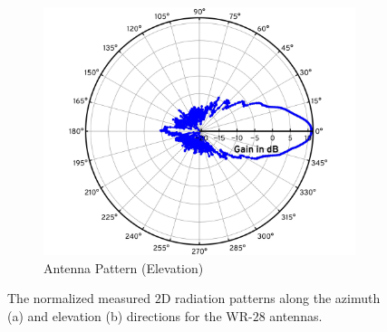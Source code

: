\documentclass[12pt, draftcls, onecolumn]{IEEEtran}
\begin{document}
{\begin{figure} [t]
\begin{subfigure}{0.494\linewidth}
         \label{F4a}
     \end{subfigure}
     \begin{subfigure}{0.496\linewidth}
         \centering
         \includegraphics[width=1.0\linewidth]{figs/antenna_pattern_el.pdf}
         \caption{Antenna Pattern (Elevation)}
         \label{F4b}
     \end{subfigure}
     \vspace{-8mm}
     \caption{The normalized measured $2$D radiation patterns along the azimuth (a) and elevation (b) directions for the WR-$28$ antennas.}
     \label{F4}
\end{figure}

}
\end{document}
